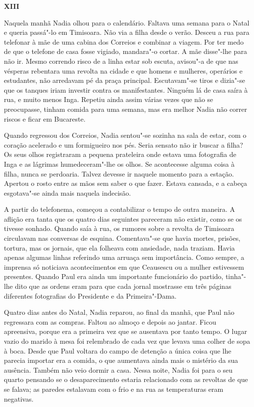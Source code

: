 \pagebreak
\movetooddpage
\vspace*{1.8cm}
\noindent{}\textbf{XIII}

\bigskip

\noindent{}Naquela manhã Nadia olhou para o calendário. Faltava uma semana para o
Natal e queria passá"-lo em Timisoara. Não via a filha desde o verão.
Desceu a rua para telefonar à mãe de uma cabina dos Correios e combinar
a viagem. Por ter medo de que o telefone de casa fosse vigiado,
mandara"-o cortar. A mãe disse"-lhe para não ir. Mesmo correndo risco de a
linha estar sob escuta, avisou"-a de que nas vésperas rebentara uma
revolta na cidade e que homens e mulheres, operários e estudantes, não
arredavam pé da praça principal. Escutavam"-se tiros e dizia"-se que os
tanques iriam investir contra os manifestantes. Ninguém lá de casa saíra
à rua, e muito menos Inga. Repetiu ainda assim várias vezes que não se
preocupasse, tinham comida para uma semana, mas era melhor Nadia não
correr riscos e ficar em Bucareste.

Quando regressou dos Correios, Nadia sentou"-se sozinha na sala de estar, com o coração acelerado e um formigueiro nos
pés. Seria sensato não ir buscar a filha? Os seus olhos registraram a
pequena prateleira onde estava uma fotografia de Inga e as lágrimas
humedeceram"-lhe os
olhos. Se acontecesse alguma coisa à filha, nunca se perdoaria. Talvez
devesse ir naquele momento para a estação. Apertou o rosto entre as mãos
sem saber o que fazer. Estava cansada, e a cabeça esgotava"-se ainda mais
naquela indecisão.

A partir do telefonema, começou a contabilizar o tempo de outra maneira.
A aflição era tanta que os quatro dias seguintes pareceram não existir,
como se os tivesse sonhado. Quando saía à rua, os rumores sobre a
revolta de Timisoara circulavam nas conversas de esquina. Comentava"-se
que havia mortes, prisões, tortura, mas os jornais, que ela folheava com
ansiedade, nada traziam. Havia apenas algumas linhas referindo uma
arruaça sem importância. Como sempre, a imprensa só noticiava acontecimentos em que Ceausescu ou a mulher estivessem presentes. Quando
Paul era ainda um importante funcionário do partido, tinha"-lhe dito
que as ordens eram para que cada jornal mostrasse em três páginas
diferentes fotografias do Presidente e da Primeira"-Dama.

Quatro dias antes do Natal, Nadia reparou, ao final da
manhã, que Paul não regressara com as compras. Faltou ao almoço e depois
ao jantar. Ficou apreensiva, porque era a primeira vez que se ausentava
por tanto tempo. O lugar vazio do marido à mesa foi relembrado de cada
vez que levava uma colher de sopa à boca. Desde que Paul voltara do
campo de detenção a única coisa que lhe parecia importar era a comida,
o que aumentava ainda mais o mistério da sua ausência. Também não veio
dormir a casa. Nessa noite, Nadia foi para o seu quarto pensando se o
desaparecimento estaria relacionado com as revoltas de que se
falava; as paredes estalavam com o frio e na rua as temperaturas eram
negativas.

